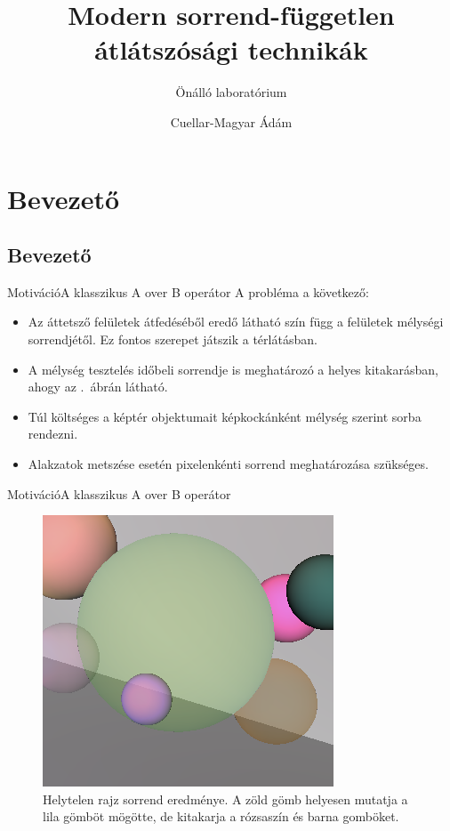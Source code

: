 \documentclass{beamer}
\title{Modern sorrend-független átlátszósági technikák}
\subtitle{Önálló  laboratórium}
\author{Cuellar-Magyar Ádám}
\begin{document}
	
\begin{frame}
	\titlepage
\end{frame}
	
\section{Bevezető}
\subsection{Bevezető}
\begin{frame}{Motiváció}{A klasszikus A over B operátor}
	A probléma a következő:
	\begin{itemize}
		\item Az áttetsző felületek átfedéséből eredő látható szín függ a felületek mélységi sorrendjétől. Ez fontos szerepet játszik a térlátásban.
		\item A mélység tesztelés időbeli sorrendje is meghatározó a helyes kitakarásban, ahogy az .~ábrán látható.
		\item Túl költséges a képtér objektumait képkockánként mélység szerint sorba rendezni.
		\item Alakzatok metszése esetén pixelenkénti sorrend meghatározása szükséges.
	\end{itemize}
\end{frame}

\begin{frame}{Motiváció}{A klasszikus A over B operátor}
	\begin{figure}
		\centering
		\includegraphics[scale=0.4]{invisglass.png}
		\caption{Helytelen rajz sorrend eredménye. A zöld gömb helyesen mutatja a lila gömböt mögötte, de kitakarja a rózsaszín és barna gomböket.}
		\label{img:invisglass}
	\end{figure}
\end{frame}
\end{document}
